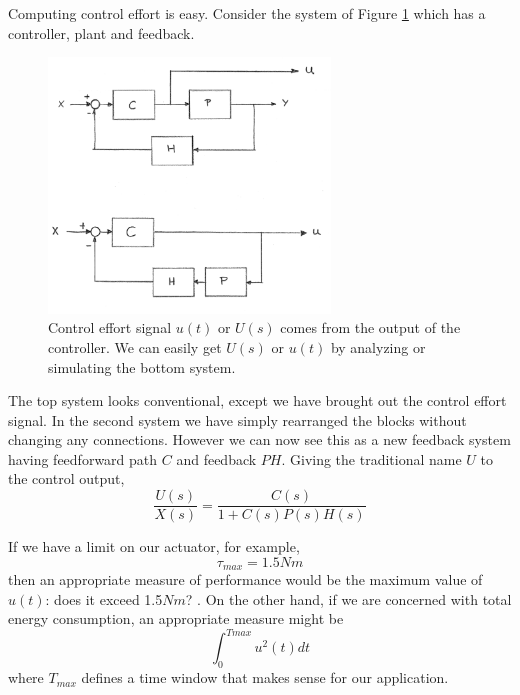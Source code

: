 Computing control effort is easy.  Consider the system of Figure \ref{controleffort}  which has a controller, plant and feedback.	%






\begin{figure}\centering
\includegraphics[width=75mm]{figs11/00650a.png}
\caption{Control effort signal $u(t)$ or $U(s)$ comes from the output of the controller. We can easily get $U(s)$ or $u(t)$ by analyzing or simulating the bottom system.}\label{controleffort}
\end{figure}






The top system looks conventional, except we have brought out the control effort signal.   In the second system we have simply rearranged the blocks without changing any connections.   However we can now see this as a new feedback system having feedforward path $C$ and feedback $PH$.  Giving the traditional name  $U$ to the control output,	%
\[
\frac{U(s)}{X(s)} = \frac {C(s)}  {1+C(s)P(s)H(s)}
\]



If we have a limit on our actuator, for example,	%
\[
\tau_{max} = 1.5 Nm
\]
then an appropriate measure of performance would be the maximum value of $u(t)$: does it exceed 1.5$Nm$? .   On the other hand, if we are concerned with total energy consumption, an appropriate measure might be	%
\[
\int_0^{Tmax} u^2(t) dt
\]
where $T_{max}$ defines a time window that makes sense for our application.	%

